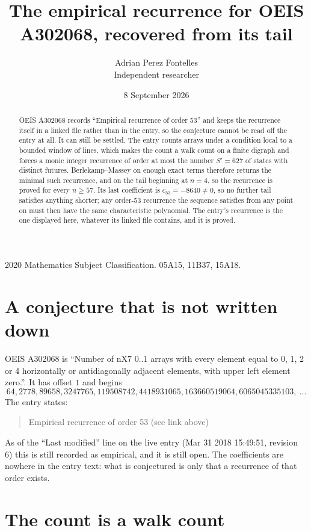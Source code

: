 \documentclass[11pt,a4paper]{article}
\title{The empirical recurrence for OEIS A302068, recovered from its tail}
\author{Adrian Perez Fontelles\\ \small Independent researcher}
\date{8 September 2026}
\theoremstyle{plain}
\theoremstyle{definition}
\begin{document}
\maketitle

\begin{abstract}
OEIS A302068 records ``Empirical recurrence of order $53$'' and keeps the recurrence itself in
a linked file rather than in the entry, so the conjecture cannot be read off the entry at all.
It can still be settled. The entry counts arrays under a condition local to a bounded window of
lines, which makes the count a walk count on a finite digraph and forces a monic integer
recurrence of order at most the number $S'=627$ of states with distinct futures. Berlekamp--Massey on
enough exact terms therefore returns the minimal such recurrence, and on the tail beginning at $n=4$, so the recurrence is proved for every $n\ge57$.
Its last coefficient is $c_{53}=-8640\neq0$, so no further tail satisfies anything
shorter; any order-$53$ recurrence the sequence satisfies from any point on must then have
the same characteristic polynomial. The entry's recurrence is the one displayed here, whatever
its linked file contains, and it is proved.
\end{abstract}

\noindent\small 2020 Mathematics Subject Classification. 05A15, 11B37, 15A18.\normalsize

\section{A conjecture that is not written down}

OEIS A302068 is ``Number of nX7 0..1 arrays with every element equal to 0, 1, 2 or 4 horizontally or antidiagonally adjacent elements, with upper left element zero.''. It has offset $1$ and begins
\[
64, 2778, 89658, 3247765, 119508742, 4418931065, 163660519064, 6065045335103,\ \dots
\]
The entry states:
\begin{quote}
Empirical recurrence of order 53 (see link above)
\end{quote}
As of the ``Last modified'' line on the live entry (Mar 31 2018 15:49:51, revision 6)
this is still recorded as empirical, and it is still open. The coefficients are nowhere in the
entry text: what is conjectured is only that a recurrence of that order exists.

\section{The count is a walk count}
\end{document}
